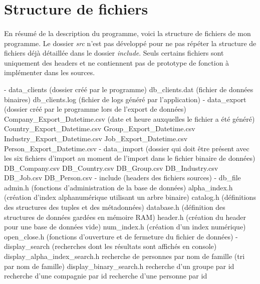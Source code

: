 \documentclass{article}
\begin{document}
    \newpage
    \section{Structure de fichiers}
    \paragraph{}
    En résumé de la description du programme, voici la structure de fichiers de mon programme. Le dossier \emph{src} n'est pas développé pour ne pas répéter la structure de fichiers déjà détaillée dans le dossier \emph{include}. Seuls certains fichiers sont uniquement des headers et ne contiennent pas de prototype de fonction à implémenter dans les sources.
 
    \begin{verbatimtab}
    - data_clients (dossier créé par le programme)
        db_clients.dat (fichier de données binaires)
        db_clients.log (fichier de logs généré par l'application)
    - data_export (dossier créé par le programme lors de l'export de données)
        Company_Export_Datetime.csv (date et heure auxquelles le fichier a été généré)
        Country_Export_Datetime.csv
        Group_Export_Datetime.csv
        Industry_Export_Datetime.csv
        Job_Export_Datetime.csv
        Person_Export_Datetime.csv
    - data_import (dossier qui doit être présent avec les six fichiers d'import
                    au moment de l'import dans le fichier binaire de données)
        DB_Company.csv
        DB_Country.csv
        DB_Group.csv
        DB_Industry.csv
        DB_Job.csv
        DB_Person.csv
    - include (headers des fichiers sources)
        - db_file
            admin.h (fonctions d'administration de la base de données)
            alpha_index.h (création d'index alphanumérique utilisant un arbre binaire)
            catalog.h (définitions des structures des tuples et des métadonnées)
            database.h (définition des structures de données gardées en mémoire RAM)
            header.h (création du header pour une base de données vide)
            num_index.h (création d'un index numérique)
            open_close.h (fonctions d'ouverture et de fermeture du fichier de données)
        - display_search (recherches dont les résultats sont affichés en console)
            display_alpha_index_search.h
                recherche de personnes par nom de famille (tri par nom de famille)
            display_binary_search.h
                recherche d'un groupe par id
                recherche d'une compagnie par id
                recherche d'une personne par id

\end{verbatimtab}
\end{document}
